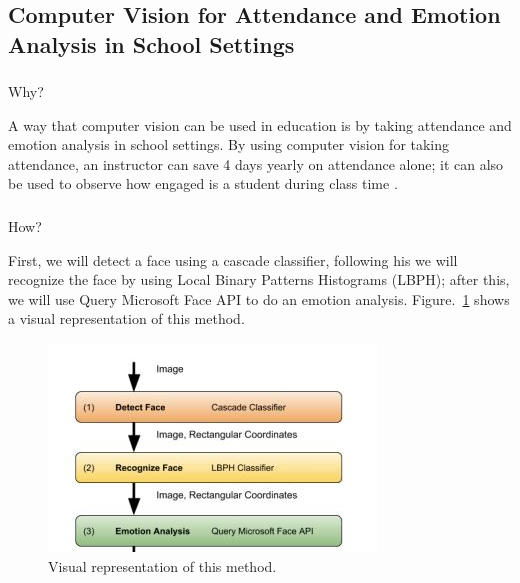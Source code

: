 \documentclass[conference]{IEEEtran}
\begin{document}

\subsection{Computer Vision for Attendance and Emotion Analysis in School Settings}
\subsubsection{}Why?

A way that computer vision can be used in education is by taking attendance and emotion analysis in school settings. By using computer vision for taking attendance, an instructor can save 4 days yearly on attendance alone; it can also be used to observe how engaged is a student during class time \cite{b1}. 

\subsubsection{}How? 

First, we will detect a face using a cascade classifier, following his we will recognize the face by using Local Binary Patterns Histograms (LBPH); after this, we will use Query Microsoft Face API to do an emotion analysis. Figure.~\ref{Emotion1} shows a visual representation of this method.

\begin{figure}[htbp]
\centerline{\includegraphics[width=\columnwidth]{Attendance_Emotion_1.JPG}}
\caption{Visual representation of this method.}
\label{Emotion1}
\end{figure}
\end{document}
